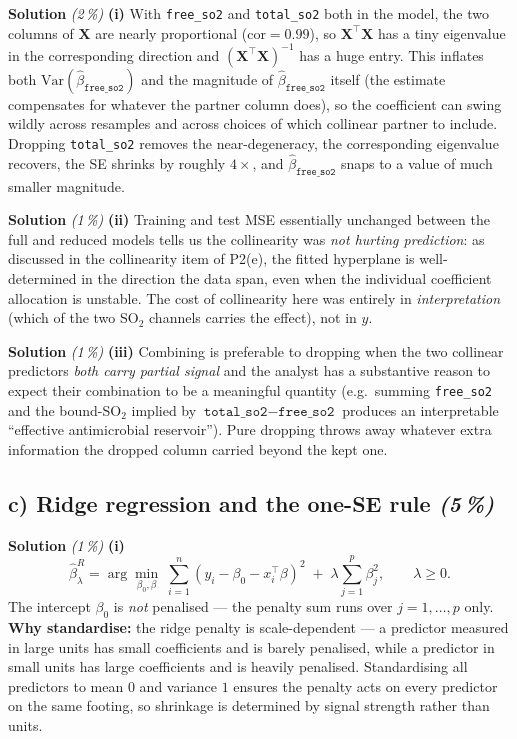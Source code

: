 \documentclass[11pt,a4paper]{article}
\newcommand{\subpoints}[1]{\textit{(#1\,\%)}}
\newcommand{\sol}{\noindent\textbf{Solution}}
\begin{document}
\sol{} \subpoints{2} \textbf{(i)} With \texttt{free\_so2} and \texttt{total\_so2} both in the
model, the two columns of $\mathbf X$ are nearly proportional ($\mathrm{cor}=0.99$), so
$\mathbf X^\top\mathbf X$ has a tiny eigenvalue in the corresponding direction and
$(\mathbf X^\top\mathbf X)^{-1}$ has a huge entry. This inflates both
$\mathrm{Var}(\hat\beta_{\texttt{free\_so2}})$ and the magnitude of $\hat\beta_{\texttt{free\_so2}}$
itself (the estimate compensates for whatever the partner column does), so the coefficient can
swing wildly across resamples and across choices of which collinear partner to include. Dropping
\texttt{total\_so2} removes the near-degeneracy, the corresponding eigenvalue recovers, the SE
shrinks by roughly $4\!\times$, and $\hat\beta_{\texttt{free\_so2}}$ snaps to a value of much
smaller magnitude.

\medskip
\sol{} \subpoints{1} \textbf{(ii)} Training and test MSE essentially unchanged between the full
and reduced models tells us the collinearity was \emph{not hurting prediction}: as discussed in
the collinearity item of P2(e), the fitted hyperplane is well-determined in the direction the data
span, even when the individual coefficient allocation is unstable. The cost of collinearity here
was entirely in \emph{interpretation} (which of the two SO$_2$ channels carries the effect), not
in $\hat y$.

\medskip
\sol{} \subpoints{1} \textbf{(iii)} Combining is preferable to dropping when the two collinear
predictors \emph{both carry partial signal} and the analyst has a substantive reason to expect
their combination to be a meaningful quantity (e.g.\ summing \texttt{free\_so2} and the
bound-SO$_2$ implied by $\texttt{total\_so2}-\texttt{free\_so2}$ produces an interpretable
``effective antimicrobial reservoir''). Pure dropping throws away whatever extra information the
dropped column carried beyond the kept one.

\subsection*{c) Ridge regression and the one-SE rule \subpoints{5}}

\sol{} \subpoints{1} \textbf{(i)}
$$\hat\beta^R_\lambda = \arg\min_{\beta_0,\beta}\;\sum_{i=1}^n(y_i - \beta_0 - x_i^\top\beta)^2
   \;+\; \lambda\sum_{j=1}^p\beta_j^2,\qquad \lambda \geq 0.$$
The intercept $\beta_0$ is \emph{not} penalised --- the penalty sum runs over $j = 1, \dots, p$
only. \textbf{Why standardise:} the ridge penalty is scale-dependent --- a predictor measured in
large units has small coefficients and is barely penalised, while a predictor in small units has
large coefficients and is heavily penalised. Standardising all predictors to mean $0$ and variance
$1$ ensures the penalty acts on every predictor on the same footing, so shrinkage is determined by
signal strength rather than units.
\end{document}
